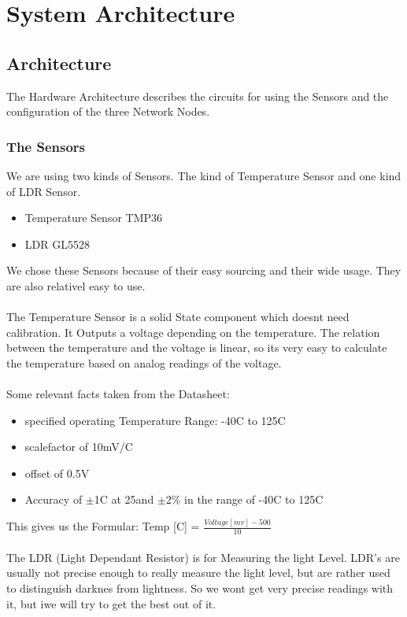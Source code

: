 \documentclass[
	11pt,
	a4paper
]{article}%
\begin{document}
\newpage
\section{System Architecture}
\subsection{Architecture}
The Hardware Architecture describes the circuits for using the Sensors and the configuration of the three Network Nodes.

\subsubsection{The Sensors}
We are using two kinds of Sensors. The kind of Temperature Sensor and one kind of LDR Sensor.
\begin{itemize}
\item Temperature Sensor TMP36
\item LDR GL5528
\end{itemize}
We chose these Sensors because of their easy sourcing and their wide usage. They are also relativel easy to use.
\\\\
The Temperature Sensor is a solid State component which doesnt need calibration. It Outputs a voltage depending on the temperature. The relation between the temperature and the voltage is linear, so its very easy to calculate the temperature based on analog readings of the voltage.
\\\\
Some relevant facts taken from the Datasheet:
\begin{itemize}
\item specified operating Temperature Range: -40\degree C to 125\degree C
\item scalefactor of 10mV/\degree C
\item offset of 0.5V
\item Accuracy of $\pm$1\degree C at 25\degree  and $\pm$2\% in the range of -40\degree C to 125\degree C
\end{itemize}
This gives us the Formular: Temp [\degree C] = \textbf{$\frac{Voltage [mv] -500}{10}$}
\\\\
The LDR (Light Dependant Resistor) is for Measuring the light Level. LDR's are usually not precise enough to really measure the light level, but are rather used to distinguish darknes from lightness. So we wont get very precise readings with it, but iwe will try to get the best out of it.
\end{document}
